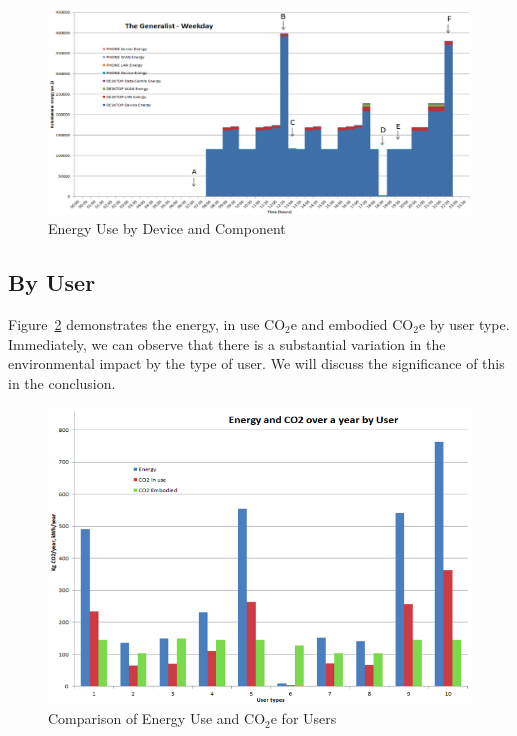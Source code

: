 \documentclass[conference]{IEEEtran}
\begin{document}
\begin{figure}[!htp]
\centering
\includegraphics[width=\textwidth]{images/generalist_weekday.png}
\caption{Energy Use by Device and Component}
\label{fig:generalist_weekday} 
\end{figure}

\subsection{By User}

Figure~\ref{fig:energyuse_co2e_overyearbyuser} demonstrates the
energy, in use CO$_2$e and embodied CO$_2$e by user type.  Immediately, we
can observe that there is a substantial variation in the environmental
impact by the type of user. We will discuss the significance of this
in the conclusion.

\begin{figure}[!htp]
\centering
\includegraphics[width=\textwidth]{images/energyuse_co2e_overyearbyuser.png}
\caption{Comparison of Energy Use and CO$_2$e for Users}
\label{fig:energyuse_co2e_overyearbyuser} 
\end{figure}
\end{document}
